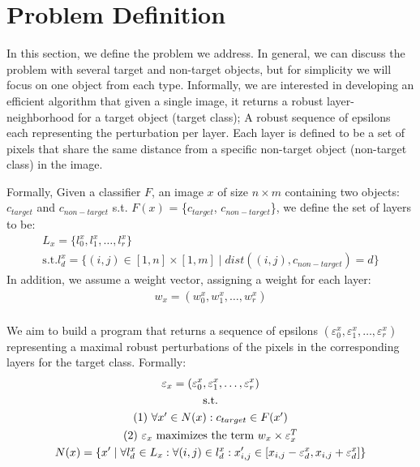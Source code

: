 
\section{Problem Definition}
In this section, we define the problem we address.
In general, we can discuss the problem with several target and non-target objects, but for simplicity we will focus on one object from each type.
Informally, we are interested in developing an efficient algorithm that given a single image, it returns a robust layer-neighborhood for a target object (target class);
A robust sequence of epsilons each representing the perturbation per layer.
Each layer is defined to be a set of pixels that share the same distance from a specific non-target object (non-target class) in the image.

Formally, Given a classifier $F$, an image $x$ of size $n\times m$ containing two objects: $c_{target}$ and $c_{non-target}$ \textrm{s.t.} $F(x)$ = \{$c_{target}$, $c_{non-target}$\},
we define the set of layers to be:
\begin{gather*}
    L_x = \{l_0^x, l_1^x, \ldots, l_r^x\}\\
    \textrm{s.t.}  l_d^x = \{(i,j) \in [1,n]\times [1,m] \mid dist((i, j), c_{non-target}) = d\}
\end{gather*}
In addition, we assume a weight vector, assigning a weight for each layer:
\begin{gather*}
    w_x = (w_0^x, w_1^x, \ldots, w_r^x)\\
\end{gather*}

We aim to build a program that returns a sequence of epsilons $(\varepsilon_0^x, \varepsilon_1^x, \ldots, \varepsilon_r^x)$ representing a maximal robust perturbations of the pixels in the corresponding layers for the target class.
Formally:
\begin{gather*}
    \varepsilon_x = (\varepsilon_0^x, \varepsilon_1^x, \ldots, \varepsilon_r^x)\\
    \textrm{s.t.}\\
    $(1) $ \forall x' \in N(x): c_{target} \in F(x')\\
    $(2) $ \varepsilon_x $ maximizes the term $ w_x \times \varepsilon_x^T\\
    N(x) = \{x' \mid \forall l_d^x\in L_x: \forall (i,j)\in l_d^x: x'_{i,j} \in [x_{i,j}-\varepsilon_d^x, x_{i,j}+\varepsilon_d^x]\}\\
\end{gather*}
